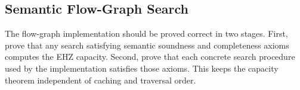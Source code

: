 %
%
%
%
%
%


\subsection{Semantic Flow-Graph Search}
\label{sec:flow-graph-semantic-search}

The flow-graph implementation should be proved correct in two stages.
First, prove that any search satisfying semantic soundness and completeness
axioms computes the EHZ capacity.  Second, prove that each concrete search
procedure used by the implementation satisfies those axioms.  This keeps the
capacity theorem independent of caching and traversal order.

